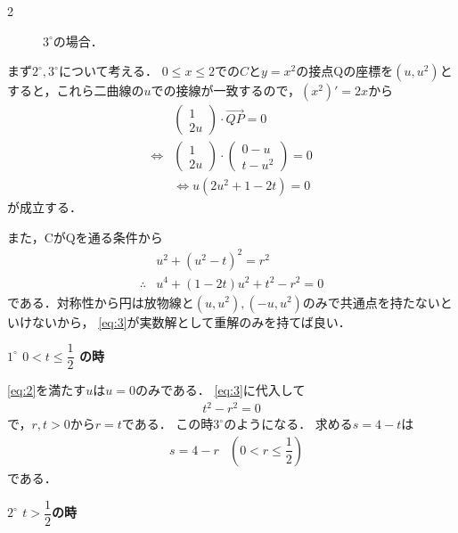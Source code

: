\documentclass[../../main.tex]{subfiles}
\begin{document}
\begin{multicols}{2}
\begin{figure}[H]
    \caption{$3^{\circ}$の場合．}
    \label{1993-3:fig:3}
  \end{figure}

  まず$2^{\circ}, 3^{\circ}$について考える．
  $0\le x \le 2$での$C$と$y=x^2$の接点Qの座標を$(u,u^2)$とすると，これら二曲線の$u$での接線が一致するので，$(x^2)'=2x$から
  \begin{align}
    &
    \begin{pmatrix} 1 \\ 2u
    \end{pmatrix} \cdot \overrightarrow{QP} = 0                                   \\
    \Leftrightarrow
    &
    \begin{pmatrix} 1 \\ 2u
    \end{pmatrix} \cdot
    \begin{pmatrix} 0-u \\ t-u^2
    \end{pmatrix} = 0 \\
    & \Leftrightarrow
    u(2u^2+1-2t) = 0 \label{eq:2}
  \end{align}
  が成立する．

  また，CがQを通る条件から
  \begin{align}
    & u^2+(u^2-t)^2=r^2                            \\
    \therefore
    & u^4+(1-2t)u^2+t^2-r^2=0  \label{eq:3}
  \end{align}
  である．対称性から円は放物線と$(u,u^2), (-u,u^2)$のみで共通点を持たないといけないから，
  \cref{eq:3}が実数解として重解のみを持てば良い．

  \textbf{$1^{\circ}$ $0<t \le \dfrac{1}{2}$ の時}

  \cref{eq:2}を満たす$u$は$u=0$のみである．
  \cref{eq:3}に代入して
  \begin{align}
    t^2-r^2 = 0
  \end{align}
  で，$r,t>0$から$r=t$である．
  この時$3^{\circ}$のようになる．
  求める$s=4-t$は
  \begin{align}
    & s = 4 -r & \left(0 < r \le \dfrac{1}{2}\right)\label{eq:4}
  \end{align}
  である．

  \textbf{$2^{\circ}$ $t>\dfrac{1}{2}$の時}


\end{multicols}
\end{document}
